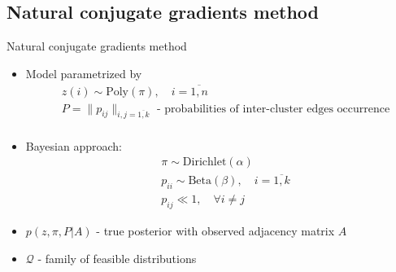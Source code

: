 \documentclass{beamer}
\theoremstyle{definition}
\theoremstyle{plain}
\theoremstyle{remark}
\begin{document}
		\subsection{Natural conjugate gradients method}
			\begin{frame}{Natural conjugate gradients method} %
                \begin{itemize}
                    \item Model parametrized by
                        \begin{equation}
                            \begin{aligned}
                            \nonumber
                                & z(i) \sim \text{Poly}(\pi), \quad i=\overline{1, n} \\
                                & P = \| p_{ij} \|_{i,j=\overline{1,k}} \text{ - probabilities of inter-cluster edges occurrence} \\
                            \end{aligned}
                        \end{equation}

                    \item Bayesian approach:
                    \begin{equation}
                        \begin{aligned}
                        \nonumber
                            & \pi \sim \text{Dirichlet}(\alpha) \\
                            & p_{ii} \sim \text{Beta}(\beta), \quad i = \overline{1,k} \\
                            & p_{ij} \ll 1, \quad \forall i\neq j
                        \end{aligned}
                    \end{equation}
                    \item $p(z, \pi, P | A)$ - true posterior with observed adjacency matrix $A$
                    \item $\mathcal Q$ - family of feasible distributions
                \end{itemize}

			\end{frame}
\end{document}
